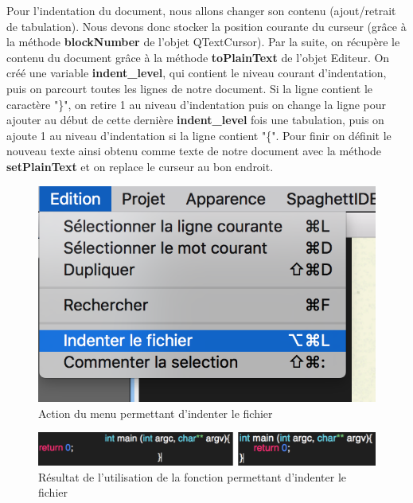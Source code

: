 \documentclass[a4paper,12pt]{article}
\begin{document}
	Pour l'indentation du document, nous allons changer son contenu (ajout/retrait de tabulation). Nous devons donc stocker la position courante du curseur (grâce à la méthode \textbf{blockNumber} de l'objet QTextCursor). Par la suite, on récupère le contenu du document grâce à la méthode \textbf{toPlainText} de l'objet Editeur. On créé une variable \textbf{indent\_level}, qui contient le niveau courant d'indentation, puis on parcourt toutes les lignes de notre document. Si la ligne contient le caractère "\}", on retire 1 au niveau d'indentation puis on change la ligne pour ajouter au début de cette dernière \textbf{indent\_level} fois une tabulation, puis on ajoute 1 au niveau d'indentation si la ligne contient "\{".
	Pour finir on définit le nouveau texte ainsi obtenu comme texte de notre document avec la méthode \textbf{setPlainText} et on replace le curseur au bon endroit.

	\begin{figure}[h!]

		\begin{center}
			\includegraphics[scale=0.5]{images/imgs_edit/utilisation_indentation}
			\caption{Action du menu permettant d'indenter le fichier}
		\end{center}
	\end{figure}

	\begin{figure}[h!]
		\begin{center}
			\includegraphics[scale=0.8]{images/imgs_edit/resultat_indentation}
			\caption{Résultat de l'utilisation de la fonction permettant d'indenter le fichier}
		\end{center}
	\end{figure}
	
\end{document}
